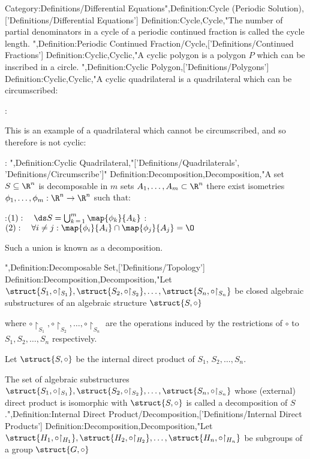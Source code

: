 Category:Definitions/Differential Equations",Definition:Cycle (Periodic Solution),['Definitions/Differential Equations']
Definition:Cycle,Cycle,"The number of partial denominators in a cycle of a periodic continued fraction is called the cycle length.
",Definition:Periodic Continued Fraction/Cycle,['Definitions/Continued Fractions']
Definition:Cyclic,Cyclic,"A cyclic polygon is a polygon $P$ which can be inscribed in a circle.
",Definition:Cyclic Polygon,['Definitions/Polygons']
Definition:Cyclic,Cyclic,"A cyclic quadrilateral is a quadrilateral which can be circumscribed:

:


This is an example of a quadrilateral which cannot be circumscribed, and so therefore is not cyclic:

:
",Definition:Cyclic Quadrilateral,"['Definitions/Quadrilaterals', 'Definitions/Circumscribe']"
Definition:Decomposition,Decomposition,"A set $S \subseteq \R^n$ is decomposable in $m$ sets $A_1, \ldots, A_m \subset \R^n$  there exist isometries $\phi_1, \ldots, \phi_m: \R^n \to \R^n$ such that:

:$(1):\quad \ds S = \bigcup_{k \mathop = 1}^m \map {\phi_k} {A_k}$ 
:$(2):\quad \forall i \ne j: \map {\phi_i} {A_i} \cap \map {\phi_j} {A_j} = \O$

Such a union is known as a decomposition.

",Definition:Decomposable Set,['Definitions/Topology']
Definition:Decomposition,Decomposition,"Let $\struct {S_1, \circ {\restriction_{S_1} } }, \struct {S_2, \circ {\restriction_{S_2} } }, \ldots, \struct {S_n, \circ {\restriction_{S_n} } }$ be closed algebraic substructures of an algebraic structure $\struct {S, \circ}$

where $\circ {\restriction_{S_1} }, \circ {\restriction_{S_2} }, \ldots, \circ {\restriction_{S_n} }$ are the operations induced by the restrictions of $\circ$ to $S_1, S_2, \ldots, S_n$ respectively.

Let $\struct {S, \circ}$ be the internal direct product of $S_1$, $S_2, \ldots, S_n$.


The set of algebraic substructures $\struct {S_1, \circ {\restriction_{S_1} } }, \struct {S_2, \circ {\restriction_{S_2} } }, \ldots, \struct {S_n, \circ {\restriction_{S_n} } }$ whose (external) direct product is isomorphic with $\struct {S, \circ}$ is called a decomposition of $S$.",Definition:Internal Direct Product/Decomposition,['Definitions/Internal Direct Products']
Definition:Decomposition,Decomposition,"Let $\struct {H_1, \circ {\restriction_{H_1} } }, \struct {H_2, \circ {\restriction_{H_2} } }, \ldots, \struct {H_n, \circ {\restriction_{H_n} } }$ be subgroups of a group $\struct {G, \circ}$

